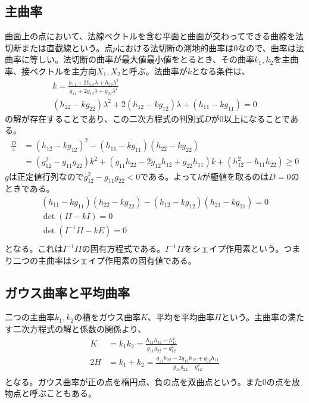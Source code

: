     \subsection{主曲率}
        曲面上の点において、法線ベクトルを含む平面と曲面が交わってできる曲線を法切断または直截線という。点$p$における法切断の測地的曲率は0なので、曲率は法曲率に等しい。法切断の曲率が最大値最小値をとるとき、その曲率$k_1,k_2$を主曲率、接ベクトルを主方向$X_1,X_2$と呼ぶ。法曲率が$k$となる条件は、
        \begin{gather*}
            k = \frac{h_{11} + 2h_{12}\lambda + h_{22}\lambda^2}{g_{11} + 2g_{12}\lambda + g_{22}\lambda^2}\\
            (h_{22} - kg_{22})\lambda^2 + 2(h_{12} - kg_{12})\lambda + (h_{11} - kg_{11}) = 0
        \end{gather*}
        の解が存在することであり、この二次方程式の判別式$D$が0以上になることである。
        \begin{align*}
            \frac{D}{4} &= (h_{12} - kg_{12})^2 - (h_{11} - kg_{11})(h_{22} - kg_{22})\\
            &= (g_{12}^2 - g_{11}g_{22})k^2 + (g_{11}h_{22} - 2g_{12}h_{12} + g_{22}h_{11})k + (h_{12}^2 - h_{11}h_{22}) \geq 0
        \end{align*}
        $g$は正定値行列なので$g_{12}^2 - g_{11}g_{22} < 0$である。よって$k$が極値を取るのは$D = 0$のときである。
        \begin{align*}
            (h_{11} - kg_{11})(h_{22} - kg_{22}) - (h_{12} - kg_{12})(h_{21} - kg_{21}) = 0\\
            \det(II - kI) = 0\\
            \det(I^{-1}II - kE) = 0\\
        \end{align*}
        となる。これは$I^{-1}II$の固有方程式である。$I^{-1}II$をシェイプ作用素という。つまり二つの主曲率はシェイプ作用素の固有値である。

    \subsection{ガウス曲率と平均曲率}
        二つの主曲率$k_1,k_2$の積をガウス曲率$K$、平均を平均曲率$H$という。主曲率の満たす二次方程式の解と係数の関係より、
        \begin{align*}
            K &= k_1k_2 = \frac{h_{11}h_{22} - h_{12}^2}{g_{11}g_{22} - g_{12}^2}\\
            2H &= k_1 + k_2 = \frac{g_{11}h_{22} - 2g_{12}h_{12} + g_{22}h_{11}}
            {g_{11}g_{22} - g_{12}^2}\\
        \end{align*}
        となる。ガウス曲率が正の点を楕円点、負の点を双曲点という。また0の点を放物点と呼ぶこともある。

